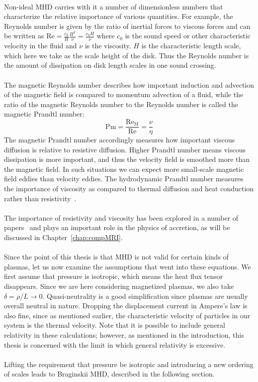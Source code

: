 \\
Non-ideal MHD carries with it a number of dimensionless numbers that characterize the relative importance of various quantities. For example, the Reynolds number is given by the ratio of inertial forces to viscous forces and can be written as $\mathrm{Re}=\frac{c_0}{H}\frac{H^2}{\nu}=\frac{c_0H}{\nu}$ where $c_0$ is the sound speed or other characteristic velocity in the fluid and $\nu$ is the viscosity. $H$ is the characteristic length scale, which here we take as the scale height of the disk. Thus the Reynolds number is the amount of dissipation on disk length scales in one sound crossing.\\
\\
The magnetic Reynolds number describes how important induction and advection of the magnetic field is compared to momentum advection of a fluid, while the ratio of the magnetic Reynolds number to the Reynolds number is called the magnetic Prandtl number:
\begin{equation}
  \mathrm{Pm}=\frac{\mathrm{Re_M}}{\mathrm{Re}}=\frac\nu\eta
\end{equation}
The magnetic Prandtl number accordingly measures how important viscous diffusion is relative to resistive diffusion. Higher Prandtl number means viscous dissipation is more important, and thus the velocity field is smoothed more than the magnetic field. In such situations we can expect more small-scale magnetic field eddies than velocity eddies. The hydrodynamic Prandtl number measures the importance of viscosity as compared to thermal diffusion and heat conduction rather than resistivity~\cite{Fromang2007b}. \\
\\
The importance of resistivity and viscosity has been explored in a number of papers~\cite{Fromang2007b,Lesur2007,Gammie1996} and plays an important role in the physics of accretion, as will be discussed in Chapter~\ref{chap:compMRI}.\\
\\
Since the point of this thesis is that MHD is not valid for certain kinds of plasmas, let us now examine the assumptions that went into these equations. We first assume that pressure is isotropic, which means the heat flux tensor disappears. Since we are here considering magnetized plasmas, we also take $\delta=\rho/L\to0$. Quasi-neutrality is a good simplification since plasmas are usually overall neutral in nature. Dropping the displacement current in Ampere's law is also fine, since as mentioned earlier, the characteristic velocity of particles in our system is the thermal velocity. Note that it is possible to include general relativity in these calculations; however, as mentioned in the introduction, this thesis is concerned with the limit in which general relativity is excessive.\\
\\
Lifting the requirement that pressure be isotropic and introducing a new ordering of scales leads to Braginskii MHD, described in the following section.

